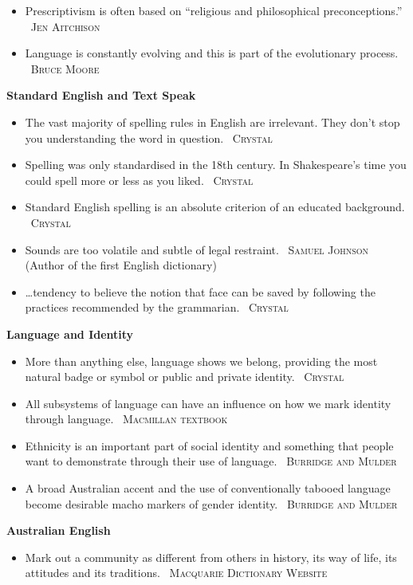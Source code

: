 \documentclass[a4paper]{article}
\newcommand{\heading}[1]{\textbf{#1}}
\newcommand{\linguist}[1]{\textemdash~\textsc{#1}}
\begin{document}
\begin{multicols}{2}
\begin{itemize}
    \item Prescriptivism is often based on ``religious and philosophical preconceptions.'' \linguist{Jen Aitchison}
    \item Language is constantly evolving and this is part of the evolutionary process. \linguist{Bruce Moore}
  \end{itemize}
  \heading{Standard English and Text Speak}
  \begin{itemize}
    \item The vast majority of spelling rules in English are irrelevant. They don't stop you understanding the word in question. \linguist{Crystal}
    \item Spelling was only standardised in the 18th century. In Shakespeare's time you could spell more or less as you liked. \linguist{Crystal}
    \item Standard English spelling is an absolute criterion of an educated background. \linguist{Crystal}
    \item Sounds are too volatile and subtle of legal restraint. \linguist{Samuel Johnson} (Author of the first English dictionary)
    \item \dots tendency to believe the notion that face can be saved by following the practices recommended by the grammarian. \linguist{Crystal}
  \end{itemize}
  \heading{Language and Identity}
  \begin{itemize}
    \item More than anything else, language shows we belong, providing the most natural badge or symbol or public and private identity. \linguist{Crystal}
    \item All subsystems of language can have an influence on how we mark identity through language. \linguist{Macmillan textbook}
    \item Ethnicity is an important part of social identity and something that people want to demonstrate through their use of language. \linguist{Burridge and Mulder}
    \item A broad Australian accent and the use of conventionally tabooed language become desirable macho markers of gender identity. \linguist{Burridge and Mulder}
  \end{itemize}
  \columnbreak
  \heading{Australian English}
  \begin{itemize}
    \item Mark out a community as different from others in history, its way of life, its attitudes and its traditions. \linguist{Macquarie Dictionary Website}

\end{itemize}
\end{multicols}
\end{document}
